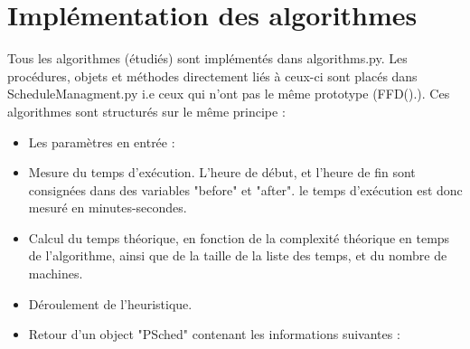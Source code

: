 \documentclass[a4paper,12pt]{report}
\theoremstyle{plain}				%
\theoremstyle{definition}				%
\begin{document}
\section{Implémentation des algorithmes}
\label{sec:ImplémentationAlgorithmes}
Tous les algorithmes (étudiés) sont implémentés dans algorithms.py. Les procédures, objets et méthodes directement liés à ceux-ci sont placés dans ScheduleManagment.py i.e ceux qui n'ont pas le même prototype (FFD().). 
Ces algorithmes sont structurés sur le même principe :
\begin{itemize}

\item Les paramètres en entrée :

\item Mesure du temps d'exécution. L'heure de début, et l'heure de fin 
sont consignées dans des variables "before" et "after". 
le temps d'exécution est donc mesuré en minutes-secondes.

\item Calcul du temps théorique, en fonction de la complexité théorique 
en temps de l’algorithme, ainsi que de la taille de la liste des temps, 
et du nombre de machines.

\item Déroulement de l'heuristique.

\item Retour d'un object "PSched" contenant les informations suivantes :
\end{itemize}
\end{document}
